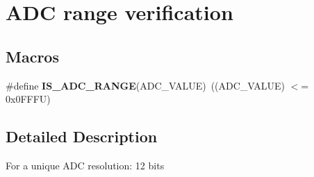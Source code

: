 \hypertarget{group___a_d_c__range__verification}{}\section{A\+DC range verification}
\label{group___a_d_c__range__verification}
\subsection*{Macros}
\begin{DoxyCompactItemize}
\item 
\mbox{\label{group___a_d_c__range__verification_gaeb31ee1528be1bee3768ff81e4e644d9}} 
\#define {\bfseries I\+S\+\_\+\+A\+D\+C\+\_\+\+R\+A\+N\+GE}(A\+D\+C\+\_\+\+V\+A\+L\+UE)~((A\+D\+C\+\_\+\+V\+A\+L\+UE) $<$= 0x0\+F\+F\+F\+U)
\end{DoxyCompactItemize}


\subsection{Detailed Description}
For a unique A\+DC resolution\+: 12 bits 